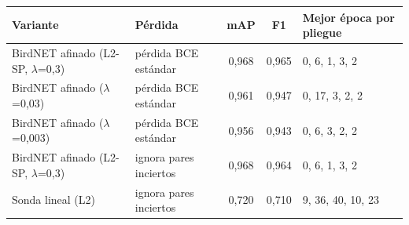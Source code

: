 \begin{tabular}{llccl}
\toprule
Variante & Pérdida & mAP & F1 & Mejor época por pliegue\\
\midrule
BirdNET afinado (L2-SP, $\lambda$=0,3) & pérdida BCE estándar & 0{,}968 & 0{,}965 & 0, 6, 1, 3, 2\\
BirdNET afinado ($\lambda$=0,03) & pérdida BCE estándar & 0{,}961 & 0{,}947 & 0, 17, 3, 2, 2\\
BirdNET afinado ($\lambda$=0,003) & pérdida BCE estándar & 0{,}956 & 0{,}943 & 0, 6, 3, 2, 2\\
BirdNET afinado (L2-SP, $\lambda$=0,3) & ignora pares inciertos & 0{,}968 & 0{,}964 & 0, 6, 1, 3, 2\\
Sonda lineal (L2) & ignora pares inciertos & 0{,}720 & 0{,}710 & 9, 36, 40, 10, 23\\
\bottomrule
\end{tabular}
